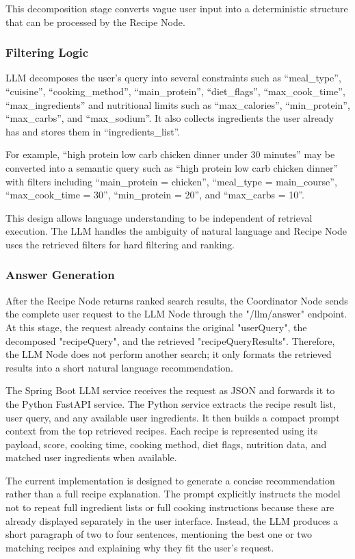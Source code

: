 \documentclass[conference]{IEEEtran}
\begin{document}
This decomposition stage converts vague user input into a deterministic structure that can be processed by the Recipe Node.

\subsubsection{Filtering Logic}
LLM decomposes the user’s query into several constraints such as ``meal\_type'', ``cuisine'', ``cooking\_method'', ``main\_protein'', ``diet\_flags'', ``max\_cook\_time'', ``max\_ingredients'' and nutritional limits such as ``max\_calories'', ``min\_protein'', ``max\_carbs'', and ``max\_sodium''. It also collects ingredients the user already has and stores them in ``ingredients\_list''.

For example, ``high protein low carb chicken dinner under 30 minutes'' may be converted into a semantic query such as ``high protein low carb chicken dinner'' with filters including ``main\_protein = chicken'', ``meal\_type = main\_course'', ``max\_cook\_time = 30'', ``min\_protein = 20'', and ``max\_carbs = 10''.

This design allows language understanding to be independent of retrieval execution. The LLM handles the ambiguity of natural language and Recipe Node uses the retrieved filters for hard filtering and ranking.


\subsubsection{Answer Generation}
After the Recipe Node returns ranked search results, the Coordinator Node sends the complete user request to the LLM Node through the "/llm/answer" endpoint. At this stage, the request already contains the original "userQuery", the decomposed "recipeQuery", and the retrieved "recipeQueryResults". Therefore, the LLM Node does not perform another search; it only formats the retrieved results into a short natural language recommendation.

The Spring Boot LLM service receives the request as JSON and forwards it to the Python FastAPI service. The Python service extracts the recipe result list, user query, and any available user ingredients. It then builds a compact prompt context from the top retrieved recipes. Each recipe is represented using its payload, score, cooking time, cooking method, diet flags, nutrition data, and matched user ingredients when available.

The current implementation is designed to generate a concise recommendation rather than a full recipe explanation. The prompt explicitly instructs the model not to repeat full ingredient lists or full cooking instructions because these are already displayed separately in the user interface. Instead, the LLM produces a short paragraph of two to four sentences, mentioning the best one or two matching recipes and explaining why they fit the user’s request.
\end{document}
